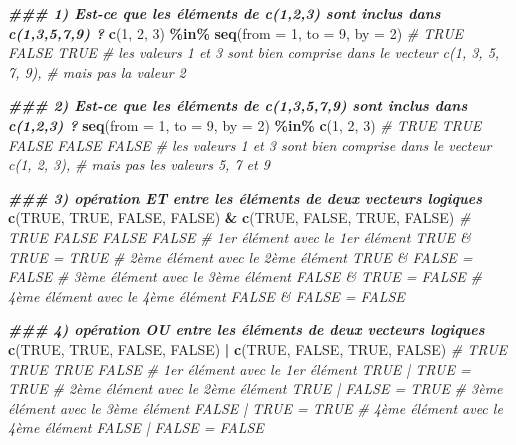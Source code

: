 \documentclass[
]{book}
\newenvironment{Shaded}{\begin{snugshade}}{\end{snugshade}}
\newcommand{\AttributeTok}[1]{\textcolor[rgb]{0.13,0.29,0.53}{#1}}
\newcommand{\CommentTok}[1]{\textcolor[rgb]{0.56,0.35,0.01}{\textit{#1}}}
\newcommand{\ConstantTok}[1]{\textcolor[rgb]{0.56,0.35,0.01}{#1}}
\newcommand{\DecValTok}[1]{\textcolor[rgb]{0.00,0.00,0.81}{#1}}
\newcommand{\DocumentationTok}[1]{\textcolor[rgb]{0.56,0.35,0.01}{\textbf{\textit{#1}}}}
\newcommand{\FunctionTok}[1]{\textcolor[rgb]{0.13,0.29,0.53}{\textbf{#1}}}
\newcommand{\NormalTok}[1]{#1}
\newcommand{\SpecialCharTok}[1]{\textcolor[rgb]{0.81,0.36,0.00}{\textbf{#1}}}
\begin{document}
\begin{Shaded}
\begin{Highlighting}[]
\DocumentationTok{\#\#\# 1) Est{-}ce que les éléments de c(1,2,3) sont inclus dans c(1,3,5,7,9) ?}
\FunctionTok{c}\NormalTok{(}\DecValTok{1}\NormalTok{, }\DecValTok{2}\NormalTok{, }\DecValTok{3}\NormalTok{) }\SpecialCharTok{\%in\%} \FunctionTok{seq}\NormalTok{(}\AttributeTok{from =} \DecValTok{1}\NormalTok{, }\AttributeTok{to =} \DecValTok{9}\NormalTok{, }\AttributeTok{by =} \DecValTok{2}\NormalTok{)}
\CommentTok{\# TRUE FALSE  TRUE}
\CommentTok{\# les valeurs 1 et 3 sont bien comprise dans le vecteur c(1, 3, 5, 7, 9), }
\CommentTok{\# mais pas la valeur 2}

\DocumentationTok{\#\#\# 2) Est{-}ce que les éléments de c(1,3,5,7,9) sont inclus dans c(1,2,3) ?}
\FunctionTok{seq}\NormalTok{(}\AttributeTok{from =} \DecValTok{1}\NormalTok{, }\AttributeTok{to =} \DecValTok{9}\NormalTok{, }\AttributeTok{by =} \DecValTok{2}\NormalTok{) }\SpecialCharTok{\%in\%} \FunctionTok{c}\NormalTok{(}\DecValTok{1}\NormalTok{, }\DecValTok{2}\NormalTok{, }\DecValTok{3}\NormalTok{)}
\CommentTok{\# TRUE  TRUE FALSE FALSE FALSE}
\CommentTok{\# les valeurs 1 et 3 sont bien comprise dans le vecteur c(1, 2, 3), }
\CommentTok{\# mais pas les valeurs 5, 7 et 9}

\DocumentationTok{\#\#\# 3) opération ET entre les éléments de deux vecteurs logiques}
\FunctionTok{c}\NormalTok{(}\ConstantTok{TRUE}\NormalTok{, }\ConstantTok{TRUE}\NormalTok{, }\ConstantTok{FALSE}\NormalTok{, }\ConstantTok{FALSE}\NormalTok{) }\SpecialCharTok{\&} \FunctionTok{c}\NormalTok{(}\ConstantTok{TRUE}\NormalTok{, }\ConstantTok{FALSE}\NormalTok{, }\ConstantTok{TRUE}\NormalTok{, }\ConstantTok{FALSE}\NormalTok{)}
\CommentTok{\# TRUE FALSE FALSE FALSE}
\CommentTok{\# 1er élément avec le 1er élément     TRUE \& TRUE = TRUE}
\CommentTok{\# 2ème élément avec le 2ème élément  TRUE \& FALSE = FALSE}
\CommentTok{\# 3ème élément avec le 3ème élément  FALSE \& TRUE = FALSE}
\CommentTok{\# 4ème élément avec le 4ème élément FALSE \& FALSE = FALSE}

\DocumentationTok{\#\#\# 4) opération OU entre les éléments de deux vecteurs logiques}
\FunctionTok{c}\NormalTok{(}\ConstantTok{TRUE}\NormalTok{, }\ConstantTok{TRUE}\NormalTok{, }\ConstantTok{FALSE}\NormalTok{, }\ConstantTok{FALSE}\NormalTok{) }\SpecialCharTok{|} \FunctionTok{c}\NormalTok{(}\ConstantTok{TRUE}\NormalTok{, }\ConstantTok{FALSE}\NormalTok{, }\ConstantTok{TRUE}\NormalTok{, }\ConstantTok{FALSE}\NormalTok{)}
\CommentTok{\# TRUE  TRUE  TRUE FALSE}
\CommentTok{\# 1er élément avec le 1er élément     TRUE | TRUE = TRUE}
\CommentTok{\# 2ème élément avec le 2ème élément  TRUE | FALSE = TRUE}
\CommentTok{\# 3ème élément avec le 3ème élément  FALSE | TRUE = TRUE}
\CommentTok{\# 4ème élément avec le 4ème élément FALSE | FALSE = FALSE}
\end{Highlighting}
\end{Shaded}
\end{document}
